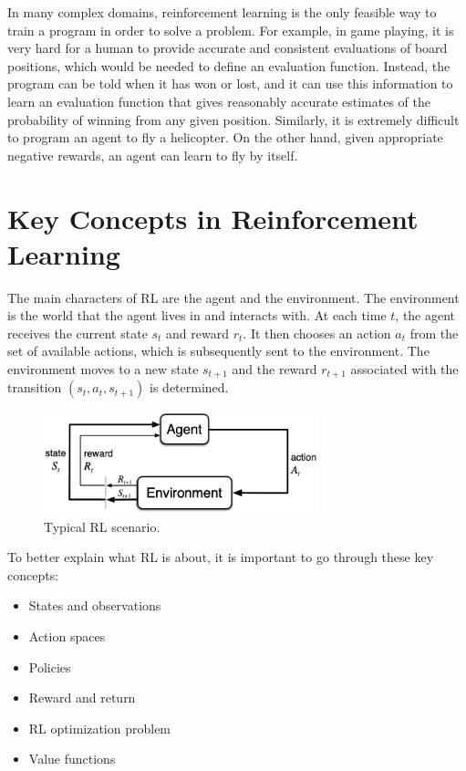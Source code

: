 \documentclass{article}
\begin{document}
In many complex domains, reinforcement learning is the only feasible way to train a program in order to solve a problem. For example, in game playing, it is very hard for a human to provide accurate and consistent evaluations of board positions, which would be needed to define an evaluation function. Instead, the program can be told when it has won or lost, and it can use this information to learn an evaluation function that gives reasonably accurate estimates of the probability of winning from any given position. Similarly, it is extremely difficult to program an agent to fly a helicopter. On the other hand, given appropriate negative rewards, an agent can learn to fly by itself.\cite{russell2016artificial}


\section{Key Concepts in Reinforcement Learning}

The main characters of RL are the agent and the environment. The environment is the world that the agent lives in and interacts with. At each time $t$, the agent receives the current state $s_t$ and reward $r_t$. It then chooses an action $a_t$ from the set of available actions, which is subsequently sent to the environment. The environment moves to a new state $s_{t+1}$ and the reward $r_{t+1}$ associated with the transition $(s_{t},a_{t},s_{t+1})$ is determined.

\begin{figure}
	\centering
	\includegraphics[width=8cm]{rl-loop.png}
	\caption{Typical RL scenario. \cite{10.5555/3312046}}
	\label{fig:rl-loop}
\end{figure}

To better explain what RL is about, it is important to go through these key concepts: \cite{SpinningUp2018}

\begin{itemize}
	\item States and observations
	\item Action spaces
	\item Policies
	\item Reward and return
	\item RL optimization problem
	\item Value functions
\end{itemize}
\end{document}
